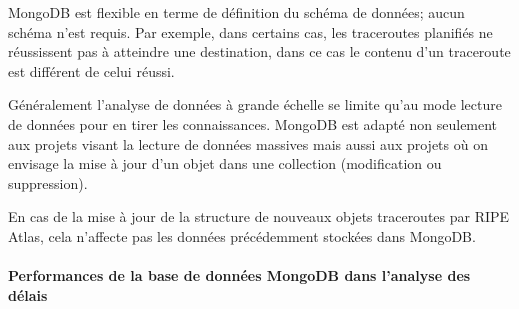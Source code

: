     MongoDB est flexible en terme de définition du schéma de données; aucun schéma n'est requis.   Par exemple, dans certains cas, les traceroutes planifiés ne réussissent pas à atteindre une destination, dans ce cas le contenu d'un traceroute est différent de celui réussi. 
    
    Généralement l'analyse de données à grande échelle se limite qu'au mode lecture de données pour en tirer les connaissances. MongoDB est adapté non seulement aux projets visant la lecture de données massives mais aussi aux projets où on envisage la mise à jour d'un objet dans une collection (modification ou suppression). 
 
 En cas de la  mise à jour de la structure de nouveaux  objets traceroutes par RIPE Atlas,  cela n'affecte pas les données précédemment  stockées  dans MongoDB.
 









\paragraph{Performances de la base de données MongoDB dans l'analyse des délais }~


